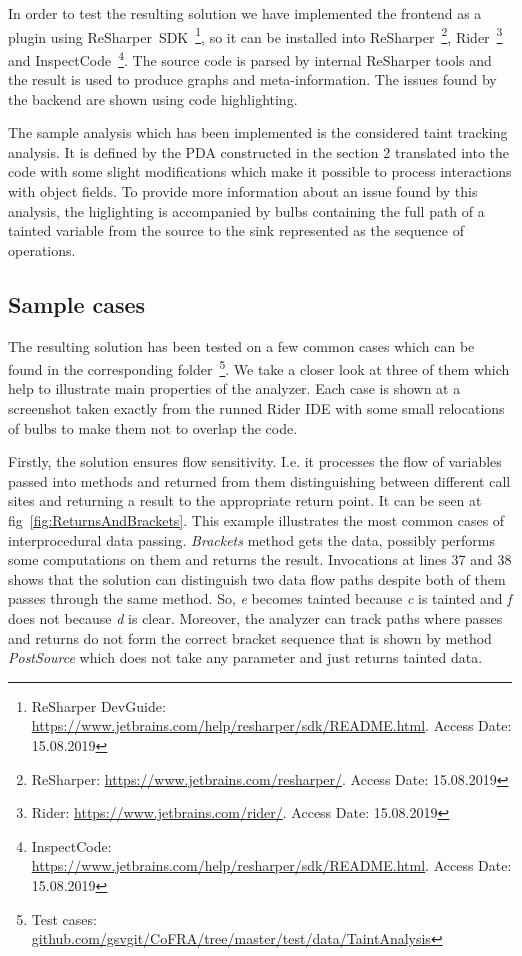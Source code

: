 In order to test the resulting solution we have implemented the frontend as a plugin using ReSharper~SDK~\footnote{ReSharper DevGuide: \url{https://www.jetbrains.com/help/resharper/sdk/README.html}. Access Date: 15.08.2019}, so it can be installed into ReSharper~\footnote{ReSharper: \url{https://www.jetbrains.com/resharper/}. Access Date: 15.08.2019}, Rider~\footnote{Rider: \url{https://www.jetbrains.com/rider/}. Access Date: 15.08.2019} and InspectCode~\footnote{InspectCode: \url{https://www.jetbrains.com/help/resharper/sdk/README.html}. Access Date: 15.08.2019}.
The source code is parsed by internal ReSharper tools and the result is used to produce graphs and meta-information.
The issues found by the backend are shown using code highlighting.

The sample analysis which has been implemented is the considered taint tracking analysis.
It is defined by the PDA constructed in the section 2 translated into the code with some slight modifications which make it possible to process interactions with object fields.
To provide more information about an issue found by this analysis, the higlighting is accompanied by bulbs containing the full path of a tainted variable from the source to the sink represented as the sequence of operations.

\subsection{Sample cases}

The resulting solution has been tested on a few common cases which can be found in the corresponding folder~\footnote{Test cases: \url{github.com/gsvgit/CoFRA/tree/master/test/data/TaintAnalysis}}.
We take a closer look at three of them which help to illustrate main properties of the analyzer.
Each case is shown at a screenshot taken exactly from the runned Rider IDE with some small relocations of bulbs to make them not to overlap the code.

Firstly, the solution ensures flow sensitivity. I.e. it processes the flow of variables passed into methods and returned from them distinguishing between different call sites and returning a result to the appropriate return point.
It can be seen at fig~\ref{fig:ReturnsAndBrackets}.
This example illustrates the most common cases of interprocedural data passing.
\textit{Brackets} method gets the data, possibly performs some computations on them and returns the result.
Invocations at lines 37 and 38 shows that the solution can distinguish two data flow paths despite both of them passes through the same method.
So, \textit{e} becomes tainted because \textit{c} is tainted and \textit{f} does not because \textit{d} is clear.
Moreover, the analyzer can track paths where passes and returns do not form the correct bracket sequence that is shown by method \textit{PostSource} which does not take any parameter and just returns tainted data.

